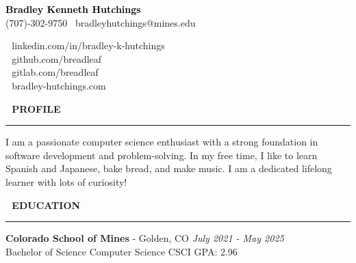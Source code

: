 \documentclass[10pt,letterpaper]{article}
\newcommand{\LinkedInIcon}{\,}
\newcommand{\GithubIcon}{\,}
\newcommand{\GitlabIcon}{\,}
\newcommand{\WebsiteIcon}{\,}
\newcommand{\ProfileIcon}{\,}
\newcommand{\EducationIcon}{\,}
\newcommand{\customtext}[2]{%
    {\fontsize{#1}{\dimexpr #1pt+2pt}\selectfont #2}%
}
\begin{document}
\mytextfont

\begin{flushleft}
    \begin{minipage}{0.48\textwidth}
        \textcolor{black}{\customtext{17}{\textbf{Bradley Kenneth Hutchings}}} \\
        \customtext{10}{(707)-302-9750 \textbullet \ bradleyhutchings@mines.edu}
    \end{minipage}
    \hfill
    \begin{minipage}{0.48\textwidth}
        \customtext{10}{\LinkedInIcon \ linkedin.com/in/bradley-k-hutchings} \\
        \customtext{10}{\GithubIcon \ github.com/breadleaf} \\
        \customtext{10}{\GitlabIcon \ gitlab.com/breadleaf} \\
        \customtext{10}{\WebsiteIcon \ bradley-hutchings.com}
    \end{minipage}

    \vspace{10pt}


    \textcolor{headercolor}{\customtext{14}{\ProfileIcon \ \textbf{PROFILE}}}
    \textcolor{gray}{\rule{\textwidth}{2pt}}

    \customtext{10}{I am a passionate computer science enthusiast with a strong foundation in software development and problem-solving. In my free time, I like to learn Spanish and Japanese, bake bread, and make music. I am a dedicated lifelong learner with lots of curiosity!}

    \vspace{10pt}


    \textcolor{headercolor}{\customtext{14}{\EducationIcon \ \textbf{EDUCATION}}}
    \textcolor{gray}{\rule{\textwidth}{2pt}}

    {\customtext{10}{\textbf{Colorado School of Mines} - Golden, CO} \hfill \customtext{10}{\textit{July 2021 - May 2025}}} \\
    \customtext{10}{Bachelor of Science Computer Science \hfill CSCI GPA: 2.96}

    \vspace{10pt}



\end{flushleft}
\end{document}
